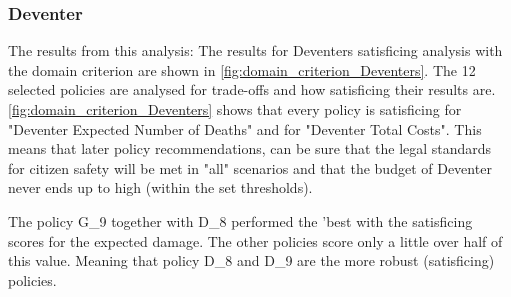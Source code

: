 \subsubsection{Deventer}
The results from this analysis: The results for Deventers satisficing analysis with the domain criterion are shown in \autoref{fig:domain_criterion_Deventers}. The 12 selected policies are analysed for trade-offs and how satisficing their results are. \newline
\autoref{fig:domain_criterion_Deventers} shows that every policy is satisficing for "Deventer Expected Number of Deaths" and for "Deventer Total Costs". This means that later policy recommendations, can be sure that the legal standards for citizen safety will be met in "all" scenarios and that the budget of Deventer never ends up to high (within the set thresholds). \newline 

\noindent The policy G\_9 together with D\_8 performed the 'best with the satisficing scores for the expected damage. The other policies score only a little over half of this value. Meaning that policy D\_8 and D\_9 are the more robust (satisficing) policies. \newline

